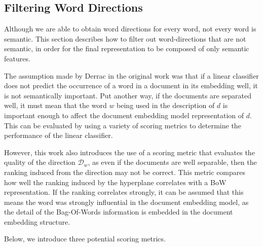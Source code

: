 


\subsection{Filtering Word Directions}


Although we are able to obtain word directions for every word, not every word is semantic. This section describes how to filter out word-directions that are not semantic, in order for the final representation to be composed of only semantic features. 
 
The assumption made by Derrac in the original work \cite{Derrac2015} was that if a linear classifier does not predict the occurrence of a word in a document in its embedding well, it is not semantically important. Put another way, if the documents are separated well, it must mean that the word $w$ being used in the description of $d$ is important enough to affect the document embedding model representation of $d$. This can be evaluated by using a variety of scoring metrics to determine the performance of the linear classifier. 

However, this work also introduces the use of a scoring metric that evaluates the quality of the direction $\mathcal{D}_w$, as even if the documents are well separable, then the ranking induced from the direction may not be correct. This metric compares how well the ranking induced by the hyperplane correlates with a BoW representation. If the ranking  correlates strongly, it can be assumed that this means the word was strongly influential in the document embedding model, as the detail of the Bag-Of-Words information is embedded in the document embedding structure. 

Below, we introduce three potential scoring metrics.


